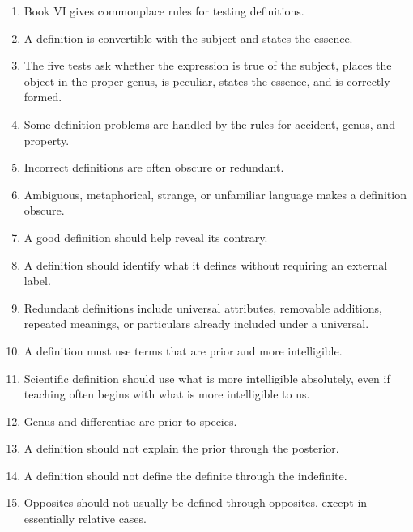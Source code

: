 \documentclass[12pt]{article}
\begin{document}
\begin{enumerate}[itemsep=0.5em]
    \item Book VI gives commonplace rules for testing definitions.

    \item A definition is convertible with the subject and states the essence.

    \item The five tests ask whether the expression is true of the subject,
    places the object in the proper genus, is peculiar, states the essence, and
    is correctly formed.

    \item Some definition problems are handled by the rules for accident, genus,
    and property.

    \item Incorrect definitions are often obscure or redundant.

    \item Ambiguous, metaphorical, strange, or unfamiliar language makes a
    definition obscure.

    \item A good definition should help reveal its contrary.

    \item A definition should identify what it defines without requiring an
    external label.

    \item Redundant definitions include universal attributes, removable
    additions, repeated meanings, or particulars already included under a
    universal.

    \item A definition must use terms that are prior and more intelligible.

    \item Scientific definition should use what is more intelligible absolutely,
    even if teaching often begins with what is more intelligible to us.

    \item Genus and differentiae are prior to species.

    \item A definition should not explain the prior through the posterior.

    \item A definition should not define the definite through the indefinite.

    \item Opposites should not usually be defined through opposites, except in
    essentially relative cases.


\end{enumerate}
\end{document}
